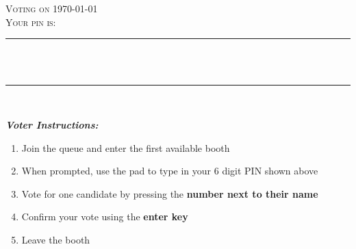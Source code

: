 \documentclass[12pt]{article}
\begin{document}
\begin{titlepage}

\newcommand{\HRule}{\rule{\linewidth}{0.5mm}}

\center

\textsc{\LARGE Voting on \today}\\[1.5cm]
\textsc{\Large Your pin is:}\\[0.4cm]

\HRule \\[0.4cm]
{ \Huge \bfseries {}}\\[0.4cm]
\HRule \\[1.5cm]


\vfill
\begin{flushleft} \large
\emph{\textbf{Voter Instructions:}}\\
\end{flushleft}
\begin{minipage}{0.95\textwidth}
\begin{enumerate}
  \item Join the queue and enter the first available booth
  \item When prompted, use the pad to type in your 6 digit PIN shown above
  \item Vote for one candidate by pressing the \textbf{number next to their name}
  \item Confirm your vote using the \textbf{enter key}
  \item Leave the booth
\end{enumerate}

\end{minipage}

\end{titlepage}
\end{document}
